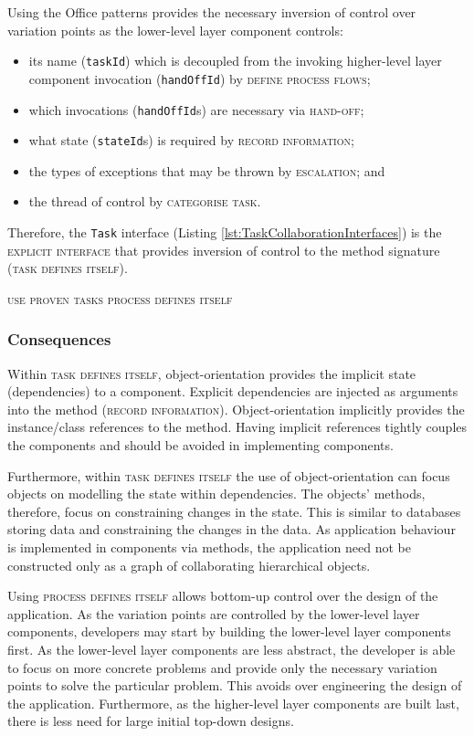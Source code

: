 \documentclass[prodmode]{style/acmlarge}
\begin{document}
Using the Office patterns provides the necessary inversion
of control over variation points as the lower-level layer component controls:
\begin{itemize}
  \item its name (\texttt{taskId}) which is decoupled from the invoking higher-level layer component invocation (\texttt{handOffId}) by \textsc{define process flows};
  \item which invocations (\texttt{handOffId}s) are necessary via \textsc{hand-off};
  \item what state (\texttt{stateId}s) is required by \textsc{record information};
  \item the types of exceptions that may be thrown by \textsc{escalation}; and
  \item the thread of control by \textsc{categorise task}.
\end{itemize}

Therefore, the \texttt{Task} interface (Listing
\ref{lst:TaskCollaborationInterfaces}) is the \textsc{explicit interface} that
provides inversion of control to the method signature (\textsc{task defines
itself}).


\textsc{use proven tasks}
\textsc{process defines itself}



\subsubsection*{Consequences}

Within \textsc{task defines itself}, object-orientation provides the implicit
state (dependencies) to a component.  Explicit dependencies are injected as
arguments into the method (\textsc{record information}).  Object-orientation
implicitly provides the instance/class references to the method.  Having
implicit references tightly couples the components and should be avoided in
implementing components.

Furthermore, within \textsc{task defines itself} the use of object-orientation
can focus objects on modelling the state within dependencies.  The objects'
methods, therefore, focus on constraining changes in the state.  This is similar
to databases storing data and constraining the changes in the data.  As
application behaviour is implemented in components via methods, the
application need not be constructed only as a graph of collaborating
hierarchical objects.

Using \textsc{process defines itself} allows bottom-up control over the design of
the application.  As the variation points are controlled by the lower-level
layer components, developers may start by building the lower-level layer
components first.  As the lower-level layer components are less abstract, the
developer is able to focus on more concrete problems and provide only the
necessary variation points to solve the particular problem.  This avoids over
engineering the design of the application.  Furthermore, as the higher-level
layer components are built last, there is less need for large initial top-down
designs.
\end{document}
